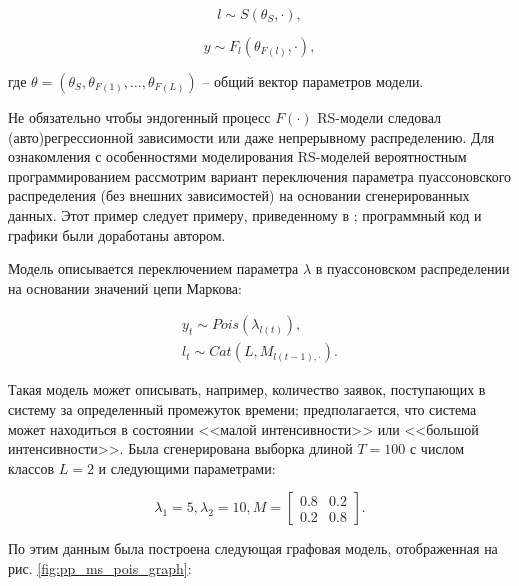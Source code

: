 \documentclass[a4paper,14pt]{extreport}
\begin{document}
\begin{equation}
	l \sim S(\theta_S, \cdot) ,
\end{equation}

\begin{equation}
	y \sim F_l(\theta_{F(l)},\cdot) ,
\end{equation}

\noindent
где $\theta = (\theta_S, \theta_{F(1)}, \dots, \theta_{F(L)}) $ -- общий вектор параметров модели. 

Не обязательно чтобы эндогенный процесс $F(\cdot)$ RS-модели следовал (авто)регрессионной зависимости или даже непрерывному распределению. Для ознакомления с особенностями моделирования RS-моделей вероятностным программированием рассмотрим вариант переключения параметра пуассоновского распределения (без внешних зависимостей) на основании сгенерированных данных. Этот пример следует примеру, приведенному в \cite{blog_hidden_markov_ravinutala}; программный код и графики были доработаны автором.

Модель описывается переключением параметра $\lambda$ в пуассоновском распределении на основании значений цепи Маркова:

\begin{equation}
	\begin{aligned}
		y_t \sim \mathit{Pois}(\lambda_{l(t)}) , \\
		l_t \sim \mathit{Cat}(L, M_{l(t-1), \cdot}) .
	\end{aligned}
	\label{eq:ms_pois_equation}
\end{equation}

Такая модель может описывать, например, количество заявок, поступающих в систему за определенный промежуток времени; предполагается, что система может находиться в состоянии <<малой интенсивности>> или <<большой интенсивности>>. Была сгенерирована выборка длиной $T=100$ с числом классов $L=2$ и следующими параметрами:

\begin{equation}
	\lambda_1 = 5, 
	\lambda_2 = 10,
	M = \left[ {\begin{array}{cc}
					0.8 & 0.2 \\
					0.2 & 0.8
				\end{array} } \right]
	\label{eq:ms_pois_coef_true}
	.
\end{equation}

\noindent
По этим данным была построена следующая графовая модель, отображенная на рис. \ref{fig:pp_ms_pois_graph}:
\end{document}
